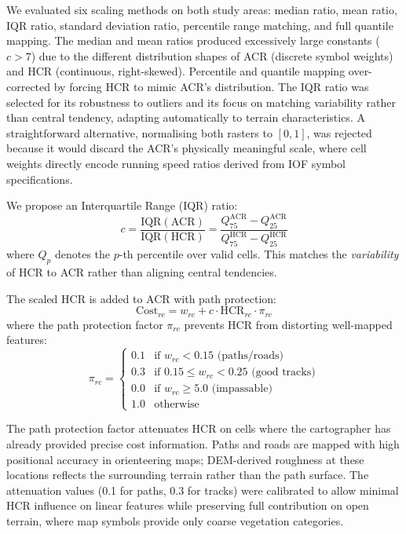\documentclass[11pt,a4paper]{article}
\begin{document}
We evaluated six scaling methods on both study areas: median ratio, mean ratio, IQR ratio, standard deviation ratio, percentile range matching, and full quantile mapping.
The median and mean ratios produced excessively large constants ($c > 7$) due to the different distribution shapes of ACR (discrete symbol weights) and HCR (continuous, right-skewed).
Percentile and quantile mapping over-corrected by forcing HCR to mimic ACR's distribution.
The IQR ratio was selected for its robustness to outliers and its focus on matching variability rather than central tendency, adapting automatically to terrain characteristics. A straightforward alternative, normalising both rasters to $[0,1]$, was rejected because it would discard the ACR's physically meaningful scale, where cell weights directly encode running speed ratios derived from IOF symbol specifications.

We propose an Interquartile Range (IQR) ratio:
\begin{equation}
  c = \frac{\text{IQR}(\text{ACR})}{\text{IQR}(\text{HCR})} = \frac{Q_{75}^{\text{ACR}} - Q_{25}^{\text{ACR}}}{Q_{75}^{\text{HCR}} - Q_{25}^{\text{HCR}}}
  \label{eq:iqr}
\end{equation}
where $Q_p$ denotes the $p$-th percentile over valid cells.
This matches the \emph{variability} of HCR to ACR rather than aligning central tendencies.

The scaled HCR is added to ACR with path protection:
\begin{equation}
  \text{Cost}_{rc} = w_{rc} + c \cdot \text{HCR}_{rc} \cdot \pi_{rc}
  \label{eq:combined}
\end{equation}
where the path protection factor $\pi_{rc}$ prevents HCR from distorting well-mapped features:
\begin{equation}
  \pi_{rc} = \begin{cases}
    0.1 & \text{if } w_{rc} < 0.15 \text{ (paths/roads)} \\
    0.3 & \text{if } 0.15 \leq w_{rc} < 0.25 \text{ (good tracks)} \\
    0.0 & \text{if } w_{rc} \geq 5.0 \text{ (impassable)} \\
    1.0 & \text{otherwise}
  \end{cases}
  \label{eq:pathprot}
\end{equation}

The path protection factor attenuates HCR on cells where the cartographer has already provided precise cost information.
Paths and roads are mapped with high positional accuracy in orienteering maps; DEM-derived roughness at these locations reflects the surrounding terrain rather than the path surface.
The attenuation values (0.1 for paths, 0.3 for tracks) were calibrated to allow minimal HCR influence on linear features while preserving full contribution on open terrain, where map symbols provide only coarse vegetation categories.
\end{document}
